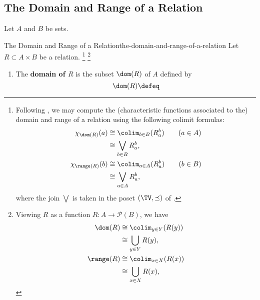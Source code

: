 \subsection{The Domain and Range of a Relation}\label{subsection-the-domain-and-range-of-a-relation}
Let $A$ and $B$ be sets.
\begin{definition}{The Domain and Range of a Relation}{the-domain-and-range-of-a-relation}%
    Let $R\subset A\times B$ be a relation.%
    \footnote{%
        Following , we may compute the (characteristic functions associated to the) domain and range of a relation using the following colimit formulas:
        \begin{align*}
            \chi_{\dom(R)}(a)   &\cong \colim_{b\in B}(R^{b}_{a})\qquad(a\in A)\\
                                &\cong \bigvee_{b\in B}R^{b}_{a},\\
            \chi_{\range(R)}(b) &\cong \colim_{a\in A}(R^{b}_{a})\qquad(b\in B)\\
                                &\cong \bigvee_{a\in A}R^{b}_{a},
        \end{align*}
        where the join $\bigvee$ is taken in the poset $(\TV,\preceq)$ of .
    }%
    \footnote{%
        Viewing $R$ as a function $R\colon A\to\mathcal{P}(B)$, we have
        \begin{align*}
            \dom(R)   &\cong \colim_{y\in Y}(R(y))\\
                      &\cong \bigcup_{y\in Y}R(y),\\
            \range(R) &\cong \colim_{x\in X}(R(x))\\
                      &\cong \bigcup_{x\in X}R(x),
        \end{align*}
        \par\vspace*{-1.75\baselineskip}
    }%
    \begin{enumerate}
        \item The \textbf{domain of $R$} is the subset $\dom(R)$ of $A$ defined by
            \[
                \dom(R)%
                \defeq%
\]
\end{enumerate}
\end{definition}
